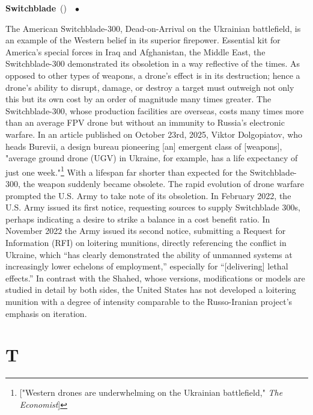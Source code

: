 \documentclass[10pt,a4paper,twoside]{article} %
\newcommand{\entry}[4]{\markboth{#1}{#1}\textbf{#1}\ {(#2)}\ \textit{#3}\ $\bullet$\ {#4}}  %
\begin{document}
\begin{multicols}{2}
\entry{Switchblade} {} {} {The American Switchblade-300, Dead-on-Arrival on the Ukrainian battlefield, is an example of the Western belief in its superior firepower. Essential kit for America's special forces in Iraq and Afghanistan, the Middle East, the Switchblade-300 demonstrated its obsoletion in a way reflective of the times. As opposed to other types of weapons, a drone's effect is in its destruction; hence a drone's ability to disrupt, damage, or destroy a target must outweigh not only this but its own cost by an order of magnitude many times greater. The Switchblade-300, whose production facilities are overseas, costs many times more than an average FPV drone but without an immunity to Russia's electronic warfare. In an article published on October 23rd, 2025, Viktor Dolgopiatov, who heads Burevii, a design bureau pioneering [an] emergent class of [weapons], "average ground drone (UGV) in Ukraine, for example, has a life expectancy of just one week."\footnote{["Western drones are underwhelming on the Ukrainian battlefield," \emph{The Economist}]} With a lifespan far shorter than expected for the Switchblade-300, the weapon suddenly became obsolete. \newline \indent The rapid evolution of drone warfare prompted the U.S. Army to take note of its obsoletion. In February 2022, the U.S. Army issued its first notice, requesting sources to supply Switchblade 300s, perhaps indicating a desire to strike a balance in a cost benefit ratio. In November 2022 the Army issued its second notice, submitting a Request for Information (RFI) on loitering munitions, directly referencing the conflict in Ukraine, which “has clearly demonstrated the ability of unmanned systems at increasingly lower echelons of employment,” especially for “[delivering] lethal effects.” \newline \indent In contrast with the Shahed, whose versions, modifications or models are studied in detail by both sides, the United States has not developed a loitering munition with a degree of intensity comparable to the Russo-Iranian project's emphasis on iteration. 

}




\end{multicols}



\section*{T}
\end{document}
